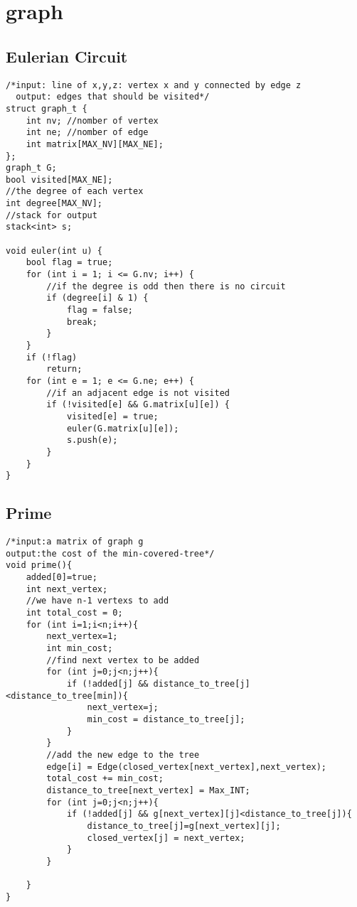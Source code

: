 \section{graph}

\subsection{Eulerian Circuit}
\begin{lstlisting}
/*input: line of x,y,z: vertex x and y connected by edge z
  output: edges that should be visited*/
struct graph_t {
    int nv; //nomber of vertex
    int ne; //nomber of edge
    int matrix[MAX_NV][MAX_NE];
};
graph_t G;
bool visited[MAX_NE];
//the degree of each vertex
int degree[MAX_NV];    
//stack for output
stack<int> s;

void euler(int u) {
    bool flag = true;
    for (int i = 1; i <= G.nv; i++) {
        //if the degree is odd then there is no circuit
        if (degree[i] & 1) {
            flag = false;
            break;
        }
    }
    if (!flag)
    	return;    
    for (int e = 1; e <= G.ne; e++) {
    	//if an adjacent edge is not visited
        if (!visited[e] && G.matrix[u][e]) {
            visited[e] = true;
            euler(G.matrix[u][e]);
            s.push(e);
        }
    }
}
\end{lstlisting}

\subsection{Prime}
\begin{lstlisting}
/*input:a matrix of graph g
output:the cost of the min-covered-tree*/
void prime(){
    added[0]=true;
    int next_vertex;
    //we have n-1 vertexs to add
    int total_cost = 0;
    for (int i=1;i<n;i++){
        next_vertex=1;
        int min_cost;
        //find next vertex to be added
        for (int j=0;j<n;j++){
            if (!added[j] && distance_to_tree[j]<distance_to_tree[min]){
                next_vertex=j;
                min_cost = distance_to_tree[j];
            }
        }
        //add the new edge to the tree
        edge[i] = Edge(closed_vertex[next_vertex],next_vertex);
        total_cost += min_cost; 
        distance_to_tree[next_vertex] = Max_INT;
        for (int j=0;j<n;j++){
            if (!added[j] && g[next_vertex][j]<distance_to_tree[j]){
                distance_to_tree[j]=g[next_vertex][j];
                closed_vertex[j] = next_vertex;
            }
        }

    }
}
\end{lstlisting}

